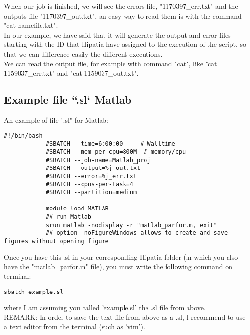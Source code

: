 \documentclass[a4paper]{article}
\begin{document}
            When our job is finished, we will see the errors file, "1170397\_err.txt" and the outputs file "1170397\_out.txt", an easy way to read them is with the command "cat namefile.txt".\\
			In our example, we have said that it will generate the output and error files starting with the ID that Hipatia have assigned to the execution of the script, so that we can difference easily the different executions.\\
			We can read the output file, for example with command "cat", like "cat 1159037\_err.txt" and "cat 1159037\_out.txt".\\
	\subsection{ Example file ``.sl` Matlab}
		An example of file ".sl" for Matlab:
		\begin{lstlisting}[caption=scp command, label=lst:scpCommand]
			#!/bin/bash
			#SBATCH --time=6:00:00     # Walltime 
			#SBATCH --mem-per-cpu=800M  # memory/cpu 
			#SBATCH --job-name=Matlab_proj 
			#SBATCH --output=%j_out.txt
			#SBATCH --error=%j_err.txt
			#SBATCH --cpus-per-task=4 
			#SBATCH --partition=medium
			
			module load MATLAB
			## run Matlab
			srun matlab -nodisplay -r "matlab_parfor.m, exit" 
			## option -noFigureWindows allows to create and save figures without opening figure
		\end{lstlisting}
		Once you have this .sl in your corresponding Hipatia folder (in which you also have the "matlab\_parfor.m" file), you must write the following command on terminal:
		\begin{lstlisting}[caption=scp command, label=lst:scpCommand]
			sbatch example.sl
		\end{lstlisting}
		where I am assuming you called 'example.sl' the .sl file from above.
		\\
		REMARK: In order to save the text file from above as a .sl, I recommend to use a text editor from the terminal (such as 'vim').
\end{document}
